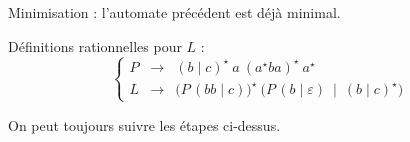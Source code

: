 \begin{corrections}
\begin{questions}
  \item Minimisation : l'automate précédent est déjà minimal.

  \item Définitions rationnelles pour $L$ :
    $$
    \left\{\begin{array}{rcl}
    P &\rightarrow& (b\mid c)^\star\ a\ (a^\star b a)^\star\ a^\star\\
    L &\rightarrow& \big(P\,(bb\mid c)\big)^\star\ \big(P\,(b\mid \varepsilon)\ \mid\ (b\mid c)^\star\big)
    \end{array}\right.
    $$

  \item On peut toujours suivre les étapes ci-dessus. 

  \end{questions}

\end{corrections}

\endgroup
\endinput
